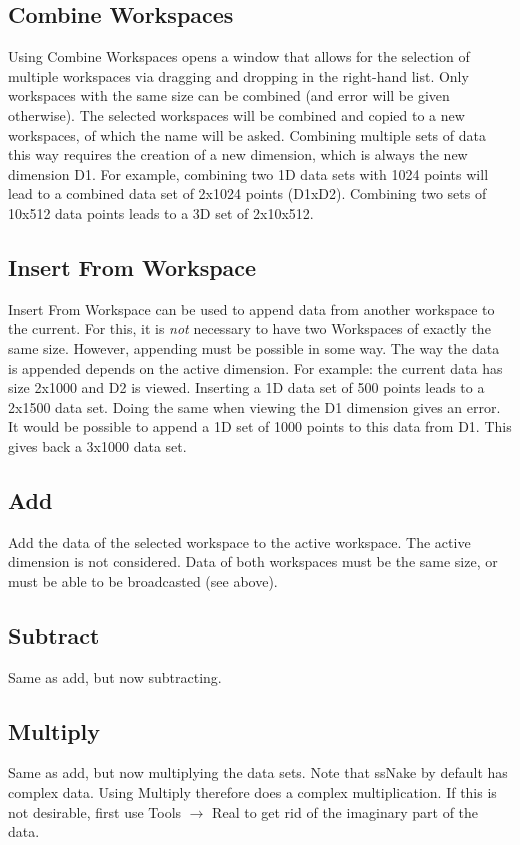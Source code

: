 \documentclass[11pt,a4paper]{article}
\begin{document}
\subsection{Combine Workspaces}
Using Combine Workspaces opens a window that allows for the selection of multiple workspaces via dragging and dropping in the right-hand list.
Only workspaces with the same size can be combined (and error will be given otherwise). The selected workspaces will be combined and copied to a new workspaces, of which the name will be asked.
Combining multiple sets of data this way requires the creation of a new dimension, which is always the new dimension D1. For example, combining two 1D data sets with 1024 points will
lead to a combined data set of 2x1024 points (D1xD2). Combining two sets of 10x512 data points leads to a 3D set of 2x10x512.


\subsection{Insert From Workspace}
Insert From Workspace can be used to append data from another workspace to the current. For this, it is \textit{not} necessary to have two Workspaces of exactly the same size.
However, appending must be possible in some way. The way the data is appended depends on the active dimension. For example: the current data has size 2x1000 and D2 is viewed.
Inserting a 1D data set of 500 points leads to a 2x1500 data set. Doing the same when viewing the D1 dimension gives an error. It would be possible to append a 1D set of 1000
points to this data from D1. This gives back a 3x1000 data set.


\subsection{Add}
Add the data of the selected workspace to the active workspace. The active dimension is not considered. Data of both workspaces must be the same size, or must be able to be broadcasted (see above).


\subsection{Subtract}
Same as add, but now subtracting.

\subsection{Multiply}
Same as add, but now multiplying the data sets. Note that ssNake by default has complex data. Using Multiply therefore does a complex multiplication.
If this is not desirable, first use Tools $\rightarrow$ Real to get rid of the imaginary part of the data.
\end{document}
